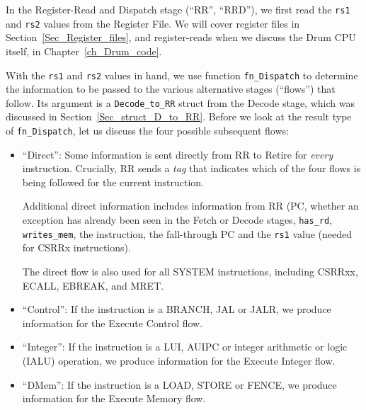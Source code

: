 
In the Register-Read and Dispatch stage (``RR'', ``RRD''), we first
read the \verb|rs1| and \verb|rs2| values from the Register File.  We
will cover register files in Section~\ref{Sec_Register_files}, and
register-reads when we discuss the Drum CPU itself, in
Chapter~\ref{ch_Drum_code}.

With the \verb|rs1| and \verb|rs2| values in hand, we use function
\verb|fn_Dispatch| to determine the information to be passed to the
various alternative stages (``flows'') that follow.  Its argument is a
\verb|Decode_to_RR| struct from the Decode stage, which was discussed
in Section~\ref{Sec_struct_D_to_RR}.  Before we look at the result
type of \verb|fn_Dispatch|, let us discuss the four possible
subsequent flows:

\begin{itemize}

  \item ``Direct'': Some information is sent directly from RR to
        Retire for \emph{every} instruction.  Crucially, RR sends a
        \emph{tag} that indicates which of the four flows is being
        followed for the current instruction.

        Additional direct information includes information from RR
        (PC, whether an exception has already been seen in the Fetch
        or Decode stages, \verb|has_rd|, \verb|writes_mem|, the
        instruction, the fall-through PC and the \verb|rs1| value
        (needed for CSRRx instructions).

       The direct flow is also used for all SYSTEM instructions,
       including CSRRxx, ECALL, EBREAK, and MRET.

  \item ``Control'': If the instruction is a BRANCH, JAL or JALR, we
        produce information for the Execute Control flow.

  \item ``Integer'': If the instruction is a LUI, AUIPC or integer
        arithmetic or logic (IALU) operation, we produce information
        for the Execute Integer flow.

  \item ``DMem'': If the instruction is a LOAD, STORE or FENCE, we
        produce information for the Execute Memory flow.

\end{itemize}

